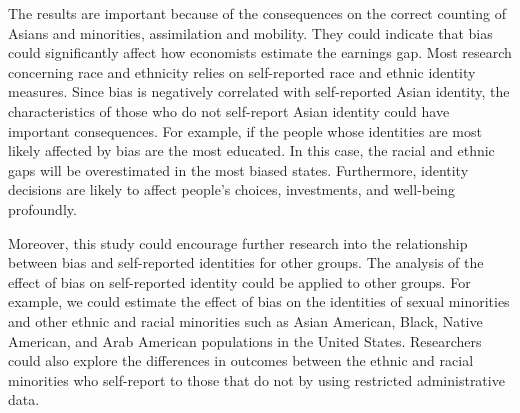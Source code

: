The results are important because of the consequences on the correct counting of Asians and minorities, assimilation and mobility. They could indicate that bias could significantly affect how economists estimate the earnings gap. Most research concerning race and ethnicity relies on self-reported race and ethnic identity measures. Since bias is negatively correlated with self-reported Asian identity, the characteristics of those who do not self-report Asian identity could have important consequences. For example, if the people whose identities are most likely affected by bias are the most educated. In this case, the racial and ethnic gaps will be overestimated in the most biased states. Furthermore, identity decisions are likely to affect people's choices, investments, and well-being profoundly. 

Moreover, this study could encourage further research into the relationship between bias and self-reported identities for other groups. The analysis of the effect of bias on self-reported identity could be applied to other groups. For example, we could estimate the effect of bias on the identities of sexual minorities and other ethnic and racial minorities such as Asian American, Black, Native American, and Arab American populations in the United States. Researchers could also explore the differences in outcomes between the ethnic and racial minorities who self-report to those that do not by using restricted administrative data. 

